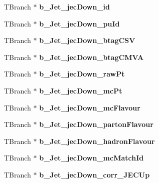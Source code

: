 \begin{DoxyCompactItemize}
\hypertarget{classMiniTree_acafc6049fec9e85eac786446821559c6}{}\label{classMiniTree_acafc6049fec9e85eac786446821559c6} 
T\+Branch $\ast$ {\bfseries b\+\_\+\+Jet\+\_\+jec\+Down\+\_\+id}
\item 
\hypertarget{classMiniTree_a10cb022f6ce1c367791982da6e1e2df5}{}\label{classMiniTree_a10cb022f6ce1c367791982da6e1e2df5} 
T\+Branch $\ast$ {\bfseries b\+\_\+\+Jet\+\_\+jec\+Down\+\_\+pu\+Id}
\item 
\hypertarget{classMiniTree_a8ec375734c6de029560a9640ed9dc0a0}{}\label{classMiniTree_a8ec375734c6de029560a9640ed9dc0a0} 
T\+Branch $\ast$ {\bfseries b\+\_\+\+Jet\+\_\+jec\+Down\+\_\+btag\+C\+SV}
\item 
\hypertarget{classMiniTree_abaf001b950c249cf15fa94eebf5a8ef8}{}\label{classMiniTree_abaf001b950c249cf15fa94eebf5a8ef8} 
T\+Branch $\ast$ {\bfseries b\+\_\+\+Jet\+\_\+jec\+Down\+\_\+btag\+C\+M\+VA}
\item 
\hypertarget{classMiniTree_a5c7c92bb6571b5ca256211ab5f3483c6}{}\label{classMiniTree_a5c7c92bb6571b5ca256211ab5f3483c6} 
T\+Branch $\ast$ {\bfseries b\+\_\+\+Jet\+\_\+jec\+Down\+\_\+raw\+Pt}
\item 
\hypertarget{classMiniTree_a60224b6064c8dce4ab1bbe82abc2b39d}{}\label{classMiniTree_a60224b6064c8dce4ab1bbe82abc2b39d} 
T\+Branch $\ast$ {\bfseries b\+\_\+\+Jet\+\_\+jec\+Down\+\_\+mc\+Pt}
\item 
\hypertarget{classMiniTree_a3b0fffea4c25445dc84dd9ef0bf81bcf}{}\label{classMiniTree_a3b0fffea4c25445dc84dd9ef0bf81bcf} 
T\+Branch $\ast$ {\bfseries b\+\_\+\+Jet\+\_\+jec\+Down\+\_\+mc\+Flavour}
\item 
\hypertarget{classMiniTree_a63b8d713636408dcaa2cf9b66da76e73}{}\label{classMiniTree_a63b8d713636408dcaa2cf9b66da76e73} 
T\+Branch $\ast$ {\bfseries b\+\_\+\+Jet\+\_\+jec\+Down\+\_\+parton\+Flavour}
\item 
\hypertarget{classMiniTree_adb674bb6023c50f803bae6716a8decaf}{}\label{classMiniTree_adb674bb6023c50f803bae6716a8decaf} 
T\+Branch $\ast$ {\bfseries b\+\_\+\+Jet\+\_\+jec\+Down\+\_\+hadron\+Flavour}
\item 
\hypertarget{classMiniTree_aa247af72fc482323d001c5d9c5710702}{}\label{classMiniTree_aa247af72fc482323d001c5d9c5710702} 
T\+Branch $\ast$ {\bfseries b\+\_\+\+Jet\+\_\+jec\+Down\+\_\+mc\+Match\+Id}
\item 
\hypertarget{classMiniTree_a05c4385a99aa10057c199954184df35d}{}\label{classMiniTree_a05c4385a99aa10057c199954184df35d} 
T\+Branch $\ast$ {\bfseries b\+\_\+\+Jet\+\_\+jec\+Down\+\_\+corr\+\_\+\+J\+E\+C\+Up}

\end{DoxyCompactItemize}
